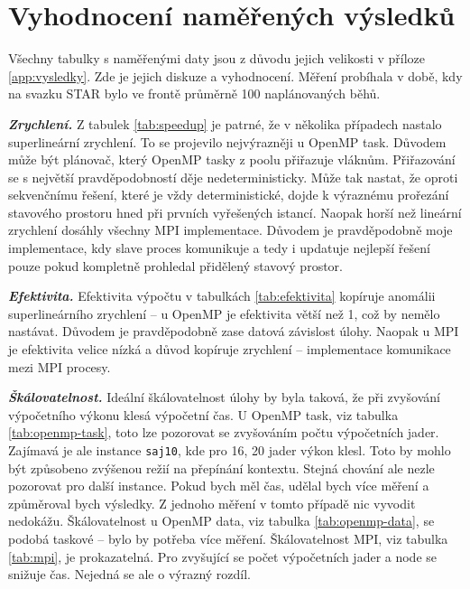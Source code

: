 \documentclass{article}
\newcommand{\navesti}[1]{\textbf{\textit{{#1}.}}}
\begin{document}
    \pagebreak
    \label{sec:vysledky}
    
    \label{sec:namerene-vysledky}
    \section{Vyhodnocení naměřených výsledků}
    Všechny tabulky s naměřenými daty jsou z důvodu jejich velikosti v příloze \ref{app:vysledky}.
    Zde je jejich diskuze a vyhodnocení. Měření probíhala v době, kdy na svazku STAR bylo ve frontě
    průměrně 100 naplánovaných běhů.
    \vspace{3mm}

    \navesti{Zrychlení} Z tabulek \ref{tab:speedup} je patrné, že v několika případech nastalo superlineární zrychlení.
    To se projevilo nejvýrazněji u OpenMP task. Důvodem může být plánovač, který OpenMP tasky z poolu přiřazuje vláknům.
    Přiřazování se s největší pravděpodobností děje nedeterministicky. Může tak nastat, že oproti sekvenčnímu řešení,
    které je vždy deterministické, dojde k výraznému prořezání stavového prostoru hned při prvních vyřešených istancí.
    Naopak horší než lineární zrychlení dosáhly všechny MPI implementace. Důvodem je pravděpodobně moje implementace,
    kdy slave proces komunikuje a tedy i updatuje nejlepší řešení pouze pokud kompletně prohledal přidělený stavový prostor.
    \vspace{3mm}

    \navesti{Efektivita} Efektivita výpočtu v tabulkách \ref{tab:efektivita} kopíruje anomálii superlineárního
    zrychlení -- u OpenMP je efektivita větší než 1, což by nemělo nastávat. Důvodem je pravděpodobně zase
    datová závislost úlohy. Naopak u MPI je efektivita velice nízká a důvod kopíruje zrychlení -- implementace
    komunikace mezi MPI procesy.
    \vspace{3mm}

    \navesti{Škálovatelnost} Ideální škálovatelnost úlohy by byla taková, že při zvyšování výpočetního výkonu
    klesá výpočetní čas. U OpenMP task, viz tabulka \ref{tab:openmp-task}, toto lze pozorovat se zvyšováním počtu výpočetních jader. Zajímavá je
    ale instance \verb|saj10|, kde pro 16, 20 jader výkon klesl. Toto by mohlo být způsobeno zvýšenou režií
     na přepínání kontextu. Stejná chování ale nezle pozorovat pro další instance. Pokud bych měl čas, udělal
     bych více měření a způměroval bych výsledky. Z jednoho měření v tomto případě nic vyvodit nedokážu.
     Škálovatelnost u OpenMP data, viz tabulka \ref{tab:openmp-data}, se podobá taskové -- bylo by potřeba více měření.
     Škálovatelnost MPI, viz tabulka \ref{tab:mpi}, je prokazatelná. Pro zvyšující se počet výpočetních jader a node
    se snižuje čas. Nejedná se ale o výrazný rozdíl.
\end{document}
